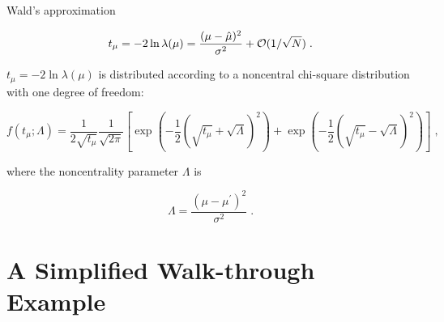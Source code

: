 \noindent Wald's approximation \cite{Wald1943}

\begin{equation}
\label{eq:wald}
t_{\mu} = -2 \ln \lambda(\mu)
= \frac{(\mu - \hat{\mu})^2}{\sigma^2} + {\cal  O}(1/\sqrt{N}) \;.
\end{equation}

 $t_{\mu} = -2 \ln \lambda(\mu)$ is distributed according to a noncentral chi-square distribution with one degree of freedom:

\begin{equation}
\label{eq:stat:ftmulambda}
f(t_{\mu};\Lambda) = \frac{1}{2 \sqrt{t_{\mu}}} \frac{1}{\sqrt{2 \pi}}
\left[ \exp \left( - \frac{1}{2}
\left( \sqrt{t_{\mu}} + \sqrt{\Lambda} \right)^2 \right) +
\exp \left( - \frac{1}{2} \left( \sqrt{t_{\mu}} - \sqrt{\Lambda} \right)^2
\right) \right] \;,
\end{equation}

\noindent where the noncentrality parameter $\Lambda$ is

\begin{equation}
\label{eq:stat:noncentrality}
\Lambda = \frac{(\mu - \mu^{\prime})^2}{\sigma^2} \;.
\end{equation}


\section{A Simplified Walk-through Example}

